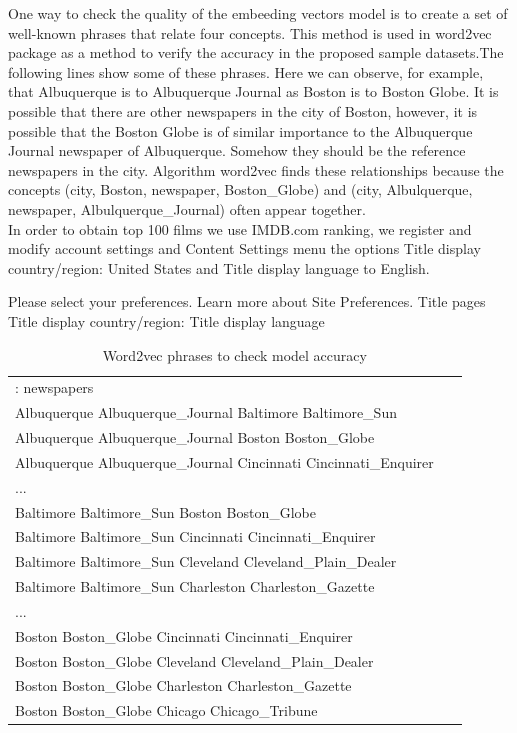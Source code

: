 \documentclass[letterpaper]{article}
\begin{document}
	 One way to check the quality of the embeeding vectors model is to create a set of 
	 well-known phrases that relate four concepts. This method is used in word2vec package \cite{mikolov2013} as a method to verify the accuracy in 
	 the proposed sample datasets.The following lines show some of these phrases. Here we can observe, for example, that Albuquerque is to Albuquerque Journal
	  as Boston is to Boston Globe. It is possible that there are other newspapers in the city of Boston, however, it is possible that the Boston Globe is of similar importance to the Albuquerque Journal newspaper of Albuquerque. Somehow they should be the reference newspapers in the city. Algorithm word2vec finds these relationships because the concepts (city, Boston, newspaper, Boston\_Globe) and (city, Albulquerque, newspaper, Albulquerque\_Journal) often appear together.\\ 
      In order to obtain top 100 films we use IMDB.com ranking, we register and modify account settings and Content Settings menu the options Title display country/region: United States and Title display language to English.
      
      Please select your preferences. Learn more about Site Preferences.
      Title pages
      Title display country/region:
      Title display language
      
\begin{table}[ht]
	\centering
	\begin{tabular}{|p{0.9\linewidth}|}
		\hline	  
	
: newspapers\\
Albuquerque Albuquerque\_Journal Baltimore Baltimore\_Sun\\
Albuquerque Albuquerque\_Journal Boston Boston\_Globe\\
Albuquerque Albuquerque\_Journal Cincinnati Cincinnati\_Enquirer\\
...\\
Baltimore Baltimore\_Sun Boston Boston\_Globe\\
Baltimore Baltimore\_Sun Cincinnati Cincinnati\_Enquirer\\
Baltimore Baltimore\_Sun Cleveland Cleveland\_Plain\_Dealer\\
Baltimore Baltimore\_Sun Charleston Charleston\_Gazette\\
...\\
Boston Boston\_Globe Cincinnati Cincinnati\_Enquirer\\
Boston Boston\_Globe Cleveland Cleveland\_Plain\_Dealer\\
Boston Boston\_Globe Charleston Charleston\_Gazette\\
Boston Boston\_Globe Chicago Chicago\_Tribune\\

  \hline
  	   	\end{tabular}
\caption{Word2vec phrases to check model accuracy}
\label{tab:k-means-clusters}
\end{table}	
	
\end{document}
